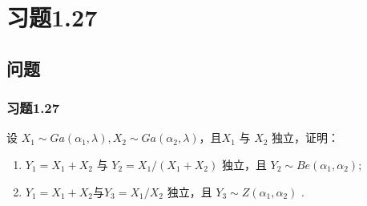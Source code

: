 \section{习题1.27}
\subsection{问题}
\begin{frame}
    \frametitle{习题1.27}
    \begin{example}{1.27}
        设 $X_1 \sim Ga(\alpha_1,\lambda),X_2\sim Ga(\alpha_2,\lambda) $，且$ X_1$ 与 $X_2$ 独立，证明：
        \begin{enumerate}
            \item $ Y_1=X_1+X_2 $ 与 $ Y_2=X_1/(X_1+X_2)$ 独立，且 $Y_2 \sim Be(\alpha_1,\alpha_2)$;
            \item $Y_1=X_1+X_2 $与$ Y_3=X_1/X_2$ 独立，且 $Y_3 \sim Z(\alpha_1,\alpha_2)$ .
        \end{enumerate}
    \end{example}
\end{frame}
